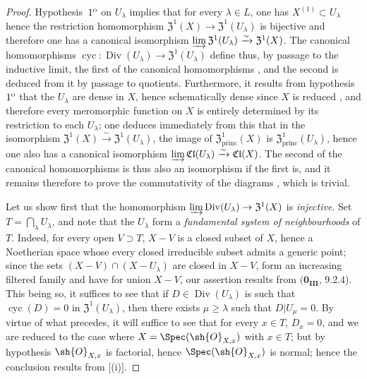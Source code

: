 \begin{proof}
Hypothesis~$1\textsuperscript{o}$ on $U_\lambda$ implies that for every $\lambda\in L$, one has $X^{(1)}\subset U_\lambda$  hence the restriction homomorphism $\mathfrak{Z}^1(X)\to\mathfrak{Z}^1(U_\lambda)$ is bijective and therefore one has a canonical isomorphism $\varinjlim\mathfrak{Z}^1(U_\lambda)\xrightarrow{\sim}\mathfrak{Z}^1(X)$.
The canonical homomorphisms $\operatorname{cyc}:\operatorname{Div}(U_\lambda)\to\mathfrak{Z}^1(U_\lambda)$ define thus, by passage to the inductive limit, the first of the canonical homomorphisms , and the second is deduced from it by passage to quotients.
Furthermore, it results from hypothesis~$1\textsuperscript{o}$ that the $U_\lambda$ are dense in $X$, hence schematically dense since $X$ is reduced , and therefore every meromorphic function on $X$ is entirely determined by its restriction to each $U_\lambda$;
one deduces immediately from this that in the isomorphism $\mathfrak{Z}^1(X)\xrightarrow{\sim}\mathfrak{Z}^1(U_\lambda)$, the image of $\mathfrak{Z}^1_{\mathrm{princ}}(X)$ is $\mathfrak{Z}^1_{\mathrm{princ}}(U_\lambda)$, hence one also has a canonical isomorphism $\varinjlim\mathfrak{Cl}(U_\lambda)\xrightarrow{\sim}\mathfrak{Cl}(X)$.
The second of the canonical homomorphisms  is thus also an isomorphism if the first is, and it remains therefore to prove the commutativity of the diagrams , which is trivial.

Let us show first that the homomorphism $\varinjlim\operatorname{Div}(U_\lambda)\to\mathfrak{Z}^1(X)$ is \emph{injective}.
Set $T=\bigcap_\lambda U_\lambda$, and note that the $U_\lambda$ form a \emph{fundamental system of neighbourhoods} of $T$.
Indeed, for every open $V\supset T$, $X-V$ is a closed subset of $X$, hence a Noetherian space whose every closed irreducible subset admits a generic point;
since the sets $(X-V)\cap(X-U_\lambda)$ are closed in $X-V$, form an increasing filtered family and have for union $X-V$, our assertion results from $(\mathbf{0_{III}}$, 9.2.4).
This being so, it suffices to see that if $D\in\operatorname{Div}(U_\lambda)$ is such that $\operatorname{cyc}(D)=0$ in $\mathfrak{Z}^1(U_\lambda)$, then there exists $\mu\geq\lambda$ such that $D|U_\mu=0$.
By virtue of what precedes, it will suffice to see that for every $x\in T$, $D_x=0$, and we are reduced to the case where $X=\Spec(\sh{O}_{X,x})$ with $x\in T$;
but by hypothesis $\sh{O}_{X,x}$ is factorial, hence $\Spec(\sh{O}_{X,x})$ is normal;
hence the conclusion results from [(i)].


\end{proof}

